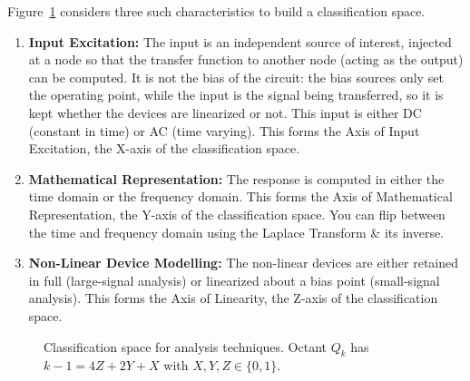 Figure~\ref{fig:analysis-classes} considers three such characteristics to
build a classification space.
\begin{enumerate}
    \item \textbf{Input Excitation:} The input is an independent source of
      interest, injected at a node so that the transfer function to another
      node (acting as the output) can be computed. It is not the bias of the
      circuit: the bias sources only set the operating point, while the input
      is the signal being transferred, so it is kept whether the devices are
      linearized or not. This input is either DC (constant in time) or AC
      (time varying).
      This forms the Axis of Input Excitation, the X-axis of the
      classification space.
    \item \textbf{Mathematical Representation:} The response is computed
      in either the time domain or the frequency domain. This forms the
      Axis of Mathematical Representation, the Y-axis of the classification
      space. You can flip between the time and frequency domain using the
      Laplace Transform \& its inverse.
    \item \textbf{Non-Linear Device Modelling:} The non-linear devices are
      either retained in full (large-signal analysis) or linearized about
      a bias point (small-signal analysis). This forms the Axis of
      Linearity, the Z-axis of the classification space.
\end{enumerate}

\begin{figure}[H]
  \centering
  \caption{Classification space for analysis techniques. Octant
    \(Q_k\) has \(k - 1 = 4Z + 2Y + X\) with \(X, Y, Z \in \{0, 1\}\).}\label{fig:analysis-classes}
\end{figure}


